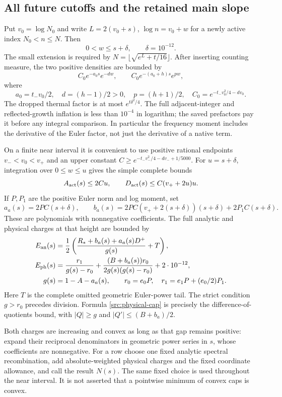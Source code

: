 \documentclass[11pt,a4paper]{article}
\theoremstyle{definition}
\theoremstyle{remark}
\begin{document}
\subsection{All future cutoffs and the retained main slope}
\label{src:activation}

Put $v_0=\log N_0$ and write
$L=2(v_0+s)$, $\log n=v_0+w$ for a newly active index $N_0<n\leq N$.
Then
\[
 0<w\leq s+\delta,\qquad\delta=10^{-12}.
\]
The small extension is required by $N=\lfloor\sqrt{e^L+t/16}\rfloor$.
After inserting counting measure, the two positive densities are bounded
by
\[
 C_0e^{-a_0s}e^{-dw},\qquad
 C_0e^{-(a_0+h)s}e^{pw},
\]
where
\[
 a_0=t_-v_0/2,\quad d=(h-1)/2>0,\quad p=(h+1)/2,
 \quad C_0=e^{-t_-v_0^2/4-dv_0}.
\]
The dropped thermal factor is at most $e^{t\delta^2/4}$.
The full adjacent-integer and reflected-growth inflation is less than
$10^{-4}$ in logarithm; the saved prefactors pay it before any integral
comparison.  In particular the frequency moment includes the derivative
of the Euler factor, not just the derivative of a native term.

On a finite near interval it is convenient to use positive rational
endpoints $v_-<v_0<v_+$ and an upper constant
$C\geq e^{-t_-v_-^2/4-dv_-+1/5000}$.  For $u=s+\delta$, integration
over $0\leq w\leq u$ gives the simple complete bounds
\begin{equation}
 A_{\rm act}(s)\leq2Cu,\qquad
 D_{\rm act}(s)\leq C(v_++2u)u.
 \label{src:activation-near}
\end{equation}
If $P,P_1$ are the positive Euler norm and log moment, set
\[
 a_a(s)=2PC(s+\delta),\qquad
 b_a(s)=2PC(v_++2(s+\delta))(s+\delta)+2P_1C(s+\delta).
\]
These are polynomials with nonnegative coefficients.  The full analytic
and physical charges at that height are bounded by
\begin{align}
 E_{\rm an}(s)&=\frac12
 \left(\frac{R_*+b_a(s)+a_a(s)D^+}{g(s)}+T\right),
 \label{src:analytic-cap}\\
 E_{\rm ph}(s)&=\frac{r_1}{g(s)-r_0}
 +\frac{(B+b_a(s))r_0}{2g(s)(g(s)-r_0)}+2\cdot10^{-12},
 \label{src:physical-cap}\\
 g(s)&=1-A-a_a(s),\qquad r_0=e_0P,
 \quad r_1=e_1P+(e_0/2)P_1.\notag
\end{align}
Here $T$ is the complete omitted geometric Euler-power tail.  The strict
condition $g>r_0$ precedes division.  Formula
\eqref{src:physical-cap} is precisely the difference-of-quotients
bound, with $|Q|\geq g$ and $|Q'|\leq(B+b_a)/2$.

Both charges are increasing and convex as long as that gap remains
positive: expand their reciprocal denominators in geometric power
series in $s$, whose coefficients are nonnegative.  For a row choose
one fixed analytic spectral recombination, add absolute-weighted physical
charges and the fixed coordinate allowance, and call the result $N(s)$.
The same fixed choice is used throughout the near interval.  It is not
asserted that a pointwise minimum of convex caps is convex.
\end{document}
